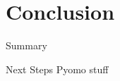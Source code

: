 \section{Conclusion}

\begin{frame}{Summary}
    
\end{frame}

\begin{frame}{Next Steps}
    Pyomo stuff
\end{frame}
    

